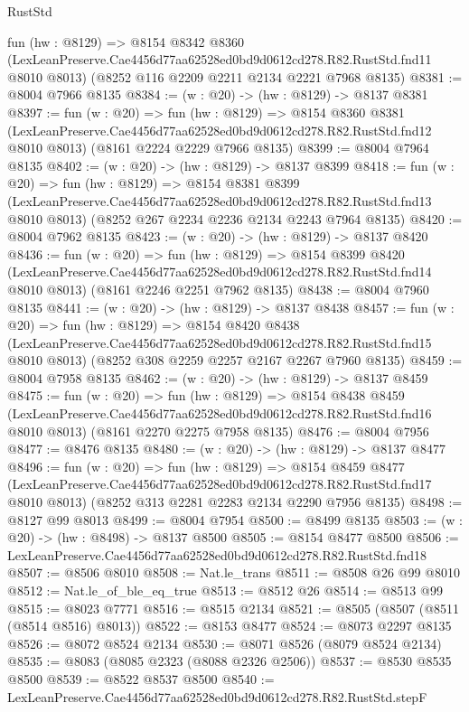\begin{lexlean}{RustStd}
\begin{coremodule}
  fun (hw : @8129) =>
  @8154
    @8342
    @8360
    (LexLeanPreserve.Cae4456d77aa62528ed0bd9d0612cd278.R82.RustStd.fnd11 @8010 @8013)
    (@8252 @116 @2209 @2211 @2134 @2221 @7968 @8135)
@8381 := @8004 @7966 @8135
@8384 := (w : @20) -> (hw : @8129) -> @8137 @8381
@8397 := fun (w : @20) =>
  fun (hw : @8129) =>
  @8154
    @8360
    @8381
    (LexLeanPreserve.Cae4456d77aa62528ed0bd9d0612cd278.R82.RustStd.fnd12 @8010 @8013)
    (@8161 @2224 @2229 @7966 @8135)
@8399 := @8004 @7964 @8135
@8402 := (w : @20) -> (hw : @8129) -> @8137 @8399
@8418 := fun (w : @20) =>
  fun (hw : @8129) =>
  @8154
    @8381
    @8399
    (LexLeanPreserve.Cae4456d77aa62528ed0bd9d0612cd278.R82.RustStd.fnd13 @8010 @8013)
    (@8252 @267 @2234 @2236 @2134 @2243 @7964 @8135)
@8420 := @8004 @7962 @8135
@8423 := (w : @20) -> (hw : @8129) -> @8137 @8420
@8436 := fun (w : @20) =>
  fun (hw : @8129) =>
  @8154
    @8399
    @8420
    (LexLeanPreserve.Cae4456d77aa62528ed0bd9d0612cd278.R82.RustStd.fnd14 @8010 @8013)
    (@8161 @2246 @2251 @7962 @8135)
@8438 := @8004 @7960 @8135
@8441 := (w : @20) -> (hw : @8129) -> @8137 @8438
@8457 := fun (w : @20) =>
  fun (hw : @8129) =>
  @8154
    @8420
    @8438
    (LexLeanPreserve.Cae4456d77aa62528ed0bd9d0612cd278.R82.RustStd.fnd15 @8010 @8013)
    (@8252 @308 @2259 @2257 @2167 @2267 @7960 @8135)
@8459 := @8004 @7958 @8135
@8462 := (w : @20) -> (hw : @8129) -> @8137 @8459
@8475 := fun (w : @20) =>
  fun (hw : @8129) =>
  @8154
    @8438
    @8459
    (LexLeanPreserve.Cae4456d77aa62528ed0bd9d0612cd278.R82.RustStd.fnd16 @8010 @8013)
    (@8161 @2270 @2275 @7958 @8135)
@8476 := @8004 @7956
@8477 := @8476 @8135
@8480 := (w : @20) -> (hw : @8129) -> @8137 @8477
@8496 := fun (w : @20) =>
  fun (hw : @8129) =>
  @8154
    @8459
    @8477
    (LexLeanPreserve.Cae4456d77aa62528ed0bd9d0612cd278.R82.RustStd.fnd17 @8010 @8013)
    (@8252 @313 @2281 @2283 @2134 @2290 @7956 @8135)
@8498 := @8127 @99 @8013
@8499 := @8004 @7954
@8500 := @8499 @8135
@8503 := (w : @20) -> (hw : @8498) -> @8137 @8500
@8505 := @8154 @8477 @8500
@8506 := LexLeanPreserve.Cae4456d77aa62528ed0bd9d0612cd278.R82.RustStd.fnd18
@8507 := @8506 @8010
@8508 := Nat.le_trans
@8511 := @8508 @26 @99 @8010
@8512 := Nat.le_of_ble_eq_true
@8513 := @8512 @26
@8514 := @8513 @99
@8515 := @8023 @7771
@8516 := @8515 @2134
@8521 := @8505 (@8507 (@8511 (@8514 @8516) @8013))
@8522 := @8153 @8477
@8524 := @8073 @2297 @8135
@8526 := @8072 @8524 @2134
@8530 := @8071 @8526 (@8079 @8524 @2134)
@8535 := @8083 (@8085 @2323 (@8088 @2326 @2506))
@8537 := @8530 @8535 @8500
@8539 := @8522 @8537 @8500
@8540 := LexLeanPreserve.Cae4456d77aa62528ed0bd9d0612cd278.R82.RustStd.stepF

\end{coremodule}
\end{lexlean}
